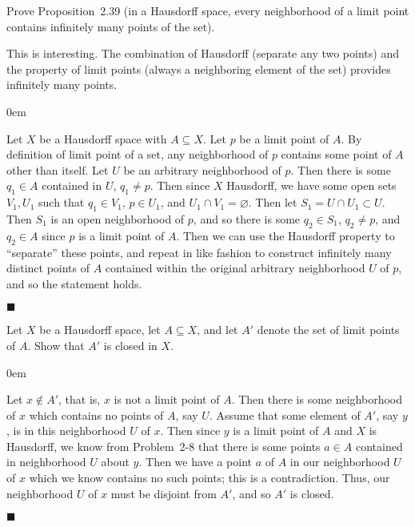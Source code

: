 \documentclass[12pt]{article}
\renewcommand{\qed}{\hfill$\blacksquare$}
\renewenvironment{proof}{\begin{addmargin}[1em]{0em}\begin{newproof}}{\end{newproof}\end{addmargin}\qed}
\newenvironment{problem}[2][Problem]{\begin{trivlist}
\item[\hskip \labelsep {\bfseries #1}\hskip \labelsep {\bfseries #2.}]}{\end{trivlist}}
\begin{document}
\begin{problem}{2-7}
	Prove Proposition~2.39 (in a Hausdorff space, every neighborhood of a limit point contains infinitely many points of the set).
\end{problem}
{\color{red} This is interesting. The combination of Hausdorff (separate any two points) and the property of limit points (always a neighboring element of the set) provides infinitely many points.}\\
\begin{proof}
Let $X$ be a Hausdorff space with $A\subseteq X$. Let $p$ be a limit point of $A$. By definition of limit point of a set, any neighborhood of $p$ contains some point of $A$ other than itself. Let $U$ be an arbitrary neighborhood of $p$. Then there is some $q_1 \in A$ contained in $U$, $q_1\neq p$. Then since $X$ Hausdorff, we have some open sets $V_1,U_1$ such that $q_1 \in V_1$, $p \in U_1$, and $U_1 \cap V_1 = \varnothing$. Then let $S_1 = U\cap U_1 \subset U$. Then $S_1$ is an open neighborhood of $p$, and so there is some $q_2 \in S_1$, $q_2\neq p$, and $q_2 \in A$ since $p$ is a limit point of $A$. Then we can use the Hausdorff property to ``separate'' these points, and repeat in like fashion to construct infinitely many distinct points of $A$ contained within the original arbitrary neighborhood $U$ of $p$, and so the statement holds.
\end{proof}



\begin{problem}{2-8}
	Let $X$ be a Hausdorff space, let $A\subseteq X$, and let $A'$ denote the set of limit points of $A$. Show that $A'$ is closed in $X$.
\end{problem}
\begin{proof}
Let $x \notin A'$, that is, $x$ is not a limit point of $A$. Then there is some neighborhood of $x$ which contains no points of $A$, say $U$. Assume that some element of $A'$, say $y$, is in this neighborhood $U$ of $x$. Then since $y$ is a limit point of $A$ and $X$ is Hausdorff, we know from Problem~2-8 that there is some points $a\in A$ contained in neighborhood $U$ about $y$. Then we have a point $a$ of $A$ in our neighborhood $U$ of $x$ which we know contains no such points; this is a contradiction. Thus, our neighborhood $U$ of $x$ must be disjoint from $A'$, and so $A'$ is closed.
\end{proof}
\end{document}
